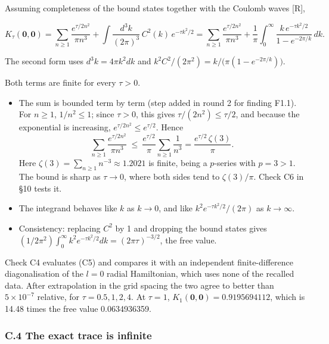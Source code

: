 \documentclass[11pt,a4paper]{article}
\newcommand{\tagmark}[1]{\marginnote{\scriptsize\ttfamily #1}}
\providecommand{\tightlist}{\setlength{\itemsep}{0pt}\setlength{\parskip}{0pt}}
\begin{document}
Assuming completeness of the bound states together with the Coulomb waves {[}R{]},

\begin{equation}
K_\tau(\mathbf 0,\mathbf 0)=\sum_{n\ge1}\frac{e^{\tau/2n^2}}{\pi n^3}+\int\frac{d^3k}{(2\pi)^3}\,C^2(k)\,e^{-\tau k^2/2}=\sum_{n\ge1}\frac{e^{\tau/2n^2}}{\pi n^3}+\frac1\pi\int_0^\infty\frac{k\,e^{-\tau k^2/2}}{1-e^{-2\pi/k}}\,dk .\tag{C5}
\end{equation}

The second form uses \(d^3k=4\pi k^2dk\) and \(k^2C^2/(2\pi^2)=k/\big(\pi(1-e^{-2\pi/k})\big)\).

Both terms are finite for every \(\tau>0\).

\begin{itemize}
\tightlist
\item
  \tagmark{[D]} The sum is bounded term by term (step added in round 2 for finding F1.1). For \(n\ge1\), \(1/n^2\le1\); since \(\tau>0\), this gives \(\tau/(2n^2)\le\tau/2\), and because the exponential is increasing, \(e^{\tau/2n^2}\le e^{\tau/2}\). Hence
  \[
\sum_{n\ge1}\frac{e^{\tau/2n^2}}{\pi n^3}\ \le\ \frac{e^{\tau/2}}{\pi}\sum_{n\ge1}\frac{1}{n^3}=\frac{e^{\tau/2}\,\zeta(3)}{\pi}.
\]
  Here \(\zeta(3)=\sum_{n\ge1}n^{-3}\approx1.2021\) is finite, being a \(p\)-series with \(p=3>1\). The bound is sharp as \(\tau\to0\), where both sides tend to \(\zeta(3)/\pi\). Check C6 in §10 tests it.
\item
  The integrand behaves like \(k\) as \(k\to0\), and like \(k^2e^{-\tau k^2/2}/(2\pi)\) as \(k\to\infty\).
\item
  Consistency: replacing \(C^2\) by 1 and dropping the bound states gives \((1/2\pi^2)\int_0^\infty k^2e^{-\tau k^2/2}dk=(2\pi\tau)^{-3/2}\), the free value.
\end{itemize}

\tagmark{[N]} Check C4 evaluates (C5) and compares it with an independent finite-difference diagonalisation of the \(l=0\) radial Hamiltonian, which uses none of the recalled data. After extrapolation in the grid spacing the two agree to better than \(5\times10^{-7}\) relative, for \(\tau=0.5,1,2,4\). At \(\tau=1\), \(K_1(\mathbf 0,\mathbf 0)=0.9195694112\), which is 14.48 times the free value 0.0634936359.

\hypertarget{c.4-the-exact-trace-is-infinite}{%
\subsubsection{C.4 The exact trace is infinite}\label{c.4-the-exact-trace-is-infinite}}
\end{document}
